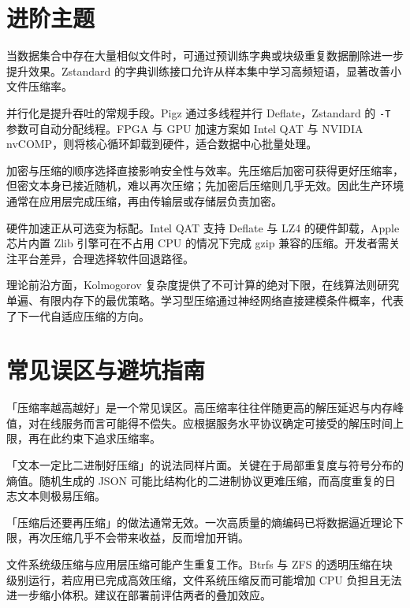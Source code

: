\chapter{进阶主题}
当数据集合中存在大量相似文件时，可通过预训练字典或块级重复数据删除进一步提升效果。Zstandard 的字典训练接口允许从样本集中学习高频短语，显著改善小文件压缩率。\par
并行化是提升吞吐的常规手段。Pigz 通过多线程并行 Deflate，Zstandard 的 \texttt{-T} 参数可自动分配线程。FPGA 与 GPU 加速方案如 Intel QAT 与 NVIDIA nvCOMP，则将核心循环卸载到硬件，适合数据中心批量处理。\par
加密与压缩的顺序选择直接影响安全性与效率。先压缩后加密可获得更好压缩率，但密文本身已接近随机，难以再次压缩；先加密后压缩则几乎无效。因此生产环境通常在应用层完成压缩，再由传输层或存储层负责加密。\par
硬件加速正从可选变为标配。Intel QAT 支持 Deflate 与 LZ4 的硬件卸载，Apple 芯片内置 Zlib 引擎可在不占用 CPU 的情况下完成 gzip 兼容的压缩。开发者需关注平台差异，合理选择软件回退路径。\par
理论前沿方面，Kolmogorov 复杂度提供了不可计算的绝对下限，在线算法则研究单遍、有限内存下的最优策略。学习型压缩通过神经网络直接建模条件概率，代表了下一代自适应压缩的方向。\par
\chapter{常见误区与避坑指南}
「压缩率越高越好」是一个常见误区。高压缩率往往伴随更高的解压延迟与内存峰值，对在线服务而言可能得不偿失。应根据服务水平协议确定可接受的解压时间上限，再在此约束下追求压缩率。\par
「文本一定比二进制好压缩」的说法同样片面。关键在于局部重复度与符号分布的熵值。随机生成的 JSON 可能比结构化的二进制协议更难压缩，而高度重复的日志文本则极易压缩。\par
「压缩后还要再压缩」的做法通常无效。一次高质量的熵编码已将数据逼近理论下限，再次压缩几乎不会带来收益，反而增加开销。\par
文件系统级压缩与应用层压缩可能产生重复工作。Btrfs 与 ZFS 的透明压缩在块级别运行，若应用已完成高效压缩，文件系统压缩反而可能增加 CPU 负担且无法进一步缩小体积。建议在部署前评估两者的叠加效应。\par
